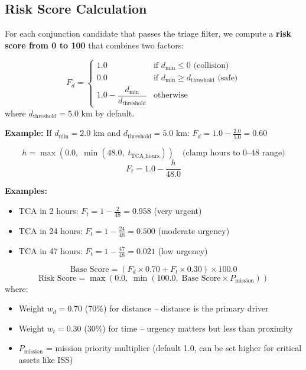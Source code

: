 \documentclass[12pt,a4paper]{article}
\begin{document}
\subsection{Risk Score Calculation}

For each conjunction candidate that passes the triage filter, we compute a \textbf{risk score from 0 to 100} that combines two factors:

\begin{formulabox}[title=Formula: Distance Factor ($F_d$)]
\[
F_d = \begin{cases}
1.0 & \text{if } d_{\min} \leq 0 \text{ (collision)} \\
0.0 & \text{if } d_{\min} \geq d_{\text{threshold}} \text{ (safe)} \\
1.0 - \dfrac{d_{\min}}{d_{\text{threshold}}} & \text{otherwise}
\end{cases}
\]
where $d_{\text{threshold}} = 5.0$ km by default.

\textbf{Example:} If $d_{\min} = 2.0$ km and $d_{\text{threshold}} = 5.0$ km:
$F_d = 1.0 - \frac{2.0}{5.0} = 0.60$
\end{formulabox}

\begin{formulabox}[title=Formula: Time Factor ($F_t$)]
\[
h = \max\left(0.0,\; \min\left(48.0,\; t_{\text{TCA\_hours}}\right)\right) \quad \text{(clamp hours to 0--48 range)}
\]
\[
F_t = 1.0 - \frac{h}{48.0}
\]

\textbf{Examples:}
\begin{itemize}
    \item TCA in 2 hours: $F_t = 1 - \frac{2}{48} = 0.958$ (very urgent)
    \item TCA in 24 hours: $F_t = 1 - \frac{24}{48} = 0.500$ (moderate urgency)
    \item TCA in 47 hours: $F_t = 1 - \frac{47}{48} = 0.021$ (low urgency)
\end{itemize}
\end{formulabox}

\begin{formulabox}[title=Formula: Final Risk Score]
\[
\text{Base Score} = (F_d \times 0.70 + F_t \times 0.30) \times 100.0
\]
\[
\text{Risk Score} = \max\left(0.0,\; \min\left(100.0,\; \text{Base Score} \times P_{\text{mission}}\right)\right)
\]
where:
\begin{itemize}
    \item Weight $w_d = 0.70$ (70\%) for distance -- distance is the primary driver
    \item Weight $w_t = 0.30$ (30\%) for time -- urgency matters but less than proximity
    \item $P_{\text{mission}}$ = mission priority multiplier (default 1.0, can be set higher for critical assets like ISS)
\end{itemize}
\end{formulabox}
\end{document}
